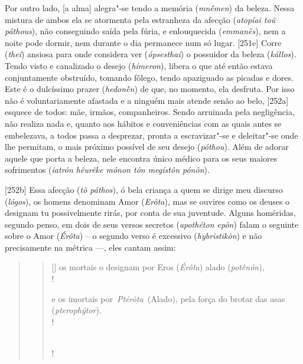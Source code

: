 Por outro lado, [a alma] alegra"-se tendo a memória (\emph{mnḗmen})
da beleza. Nessa mistura de ambos ela se atormenta pela estranheza da
afecção (\emph{atopíai toû páthous}), não conseguindo saída pela fúria,
e enlouquecida (\emph{emmanès}), nem a noite pode dormir, nem durante o
dia permanece num só lugar. [251e] Corre (\emph{theî}) ansiosa para
onde considera ver (\emph{ópsesthai}) o possuidor da beleza
(\emph{kállos}). Tendo visto e canalizado o desejo (\emph{hímeron}),
libera o que até então estava conjuntamente obstruído, tomando fôlego,
tendo apaziguado as picadas e dores. Este é o dulcíssimo prazer
(\emph{hedonḕn}) de que, no momento, ela desfruta. Por isso não é
voluntariamente afastada e a ninguém mais atende senão ao belo,
[252a] esquece de todos: mãe, irmãos, companheiros. Sendo arruinada
pela negligência, não realiza nada e, quanto aos hábitos e conveniências
com as quais antes se embelezava, a todos passa a desprezar, pronta a
escravizar"-se e deleitar"-se onde lhe permitam, o mais próximo possível
de seu desejo (\emph{póthou}). Além de adorar aquele que porta a beleza,
nele encontra único médico para os seus maiores sofrimentos
(\emph{iatrón hêurêke mónon tôn megístôn pónôn}).

[252b] Essa afecção (\emph{tò páthos}), ó bela criança a quem se
dirige meu discurso (\emph{lógos}), os homens denominam Amor
(\emph{Erôta}), mas se ouvires como os deuses o designam tu
possivelmente rirás, por conta de sua juventude. Alguns homéridas,
segundo penso, em dois de seus versos secretos (\emph{apothéton epôn})
falam o seguinte sobre o Amor (\emph{Érôta}) -- o segundo verso é
excessivo (\emph{hybristikòn}) e não precisamente na métrica \mbox{---,} eles
cantam assim:

\begin{quote}
 


\begin{verse}[\versewidth]
os mortais o designam por Eros (\emph{Érôta}) alado (\emph{potênón}),\\!

e os imortais por\emph{~Ptérôta}~(Alado), pela força do brotar das asas
(\emph{pterophýtor}).\\!

 \\!
\end{verse} 
\end{quote}

 

